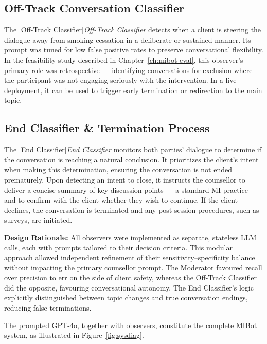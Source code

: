 \subsection{Off-Track Conversation Classifier}
The [Off-Track Classifier]\textit{Off-Track Classifier} detects when a client is steering the dialogue away from smoking cessation in a deliberate or sustained manner. Its prompt was tuned for low false positive rates to preserve conversational flexibility. In the feasibility study described in Chapter~\ref{ch:mibot-eval}, this observer's primary role was retrospective --- identifying conversations for exclusion where the participant was not engaging seriously with the intervention. In a live deployment, it can be used to trigger early termination or redirection to the main topic.

\subsection{End Classifier \& Termination Process}
The [End Classifier]\textit{End Classifier} monitors both parties' dialogue to determine if the conversation is reaching a natural conclusion. It prioritizes the client's intent when making this determination, ensuring the conversation is not ended prematurely. Upon detecting an intent to close, it instructs the counsellor to deliver a concise summary of key discussion points --- a standard MI practice --- and to confirm with the client whether they wish to continue. If the client declines, the conversation is terminated and any post-session procedures, such as surveys, are initiated.


\textbf{Design Rationale:} All observers were implemented as separate, stateless LLM calls, each with prompts tailored to their decision criteria. This modular approach allowed independent refinement of their sensitivity–specificity balance without impacting the primary counsellor prompt. The Moderator favoured recall over precision to err on the side of client safety, whereas the Off-Track Classifier did the opposite, favouring conversational autonomy. The End Classifier's logic explicitly distinguished between topic changes and true conversation endings, reducing false terminations.


The prompted GPT-4o, together with observers, constitute the complete MIBot system, as illustrated in Figure~\ref{fig:sysdiag}.





